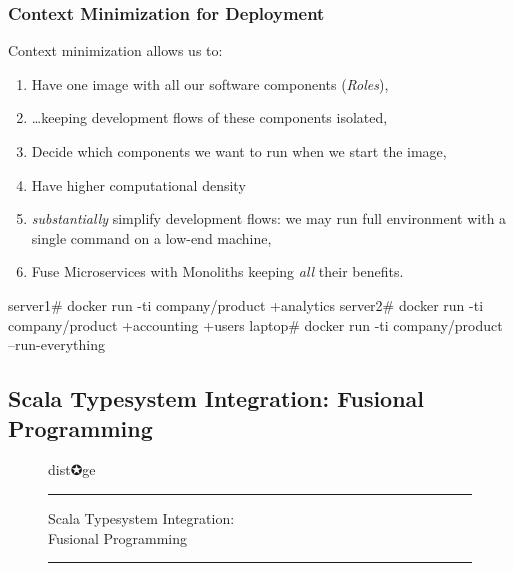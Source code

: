 \documentclass[usenames,dvipsnames]{beamer}
\begin{document}
\begin{frame}[fragile]
\frametitle{Context Minimization for Deployment}
Context minimization allows us to:
\begin{enumerate}
\item Have one image with all our software components (\textit{Roles}\footnotemark[1]),
\item \dots keeping development flows of these components isolated,
\item Decide which components we want to run when we start the image,
\item Have higher computational density 
\item \textit{substantially} simplify development flows: we may run full environment with a single command on a low-end machine, 
\item Fuse Microservices with Monoliths keeping \textit{all} their benefits.
\end{enumerate}

\begin{textcode}
server1# docker run -ti company/product +analytics
server2# docker run -ti company/product +accounting +users
laptop# docker run -ti company/product --run-everything
\end{textcode}

\end{frame}

\subsection{Scala Typesystem Integration: Fusional Programming}
\begin{frame}
\begin{figure}
\Huge 
\color{RubineRed} dist✪ge
\noindent
\rule{\linewidth}{1mm}
\Large Scala Typesystem Integration:\\
Fusional Programming
\rule{\linewidth}{1mm}
\end{figure}
\end{frame}
\end{document}
